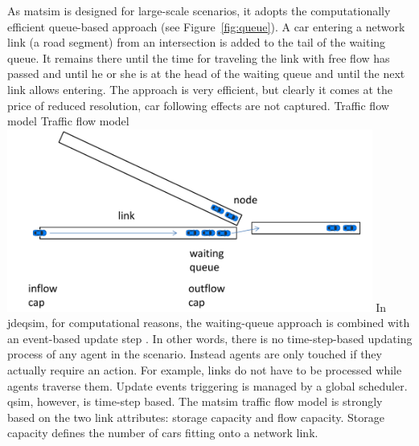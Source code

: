 As \gls{matsim} is designed for large-scale \glspl{scenario}, it adopts the computationally efficient queue-based approach (see Figure~\ref{fig:queue}). A car entering a network link (\ie a road segment) from an intersection is added to the tail of the waiting queue. It remains there until the time for traveling the link with free flow has passed and until he or she is at the head of the waiting queue and until the next link allows entering. The approach is very efficient, but clearly it comes at the price of reduced resolution, \ie car following effects are not captured.   
%
\createfigure%
{Traffic flow model}%
{Traffic flow model}%
{\label{fig:queue}}%
{\includegraphics[width=0.9\textwidth, angle=0]{using/figures/queue.pdf}}%
{}
%
In \gls{jdeqsim}, for computational reasons, the waiting-queue approach is combined with an event-based update step \citep[][]{CharyparEtAl_TRB_2009}. In other words, there is no time-step-based updating process of any agent in the scenario. Instead agents are only touched if they actually require an action. For example, links do not have to be processed while agents traverse them.
%
%
Update events triggering is managed by a global scheduler. \gls{qsim}, however, is time-step based. 
%
%
%
The \gls{matsim} traffic flow model is strongly based on the two link attributes: storage capacity and flow capacity. Storage capacity defines the number of cars fitting onto a network link.
%
%

